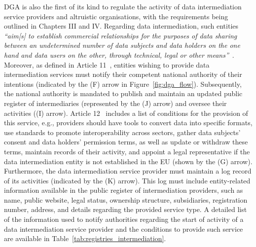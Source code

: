 DGA is also the first of its kind to regulate the activity of data intermediation service providers and altruistic organisations, with the requirements being outlined in Chapters III and IV.
Regarding data intermediation, such entities \textit{``aim[s] to establish commercial relationships for the purposes of data sharing between an undetermined number of data subjects and data holders on the one hand and data users on the other, through technical, legal or other means''}~\citeyearpar{noauthor_regulation_2022}.
Moreover, as defined in Article 11~\citeyearpar{noauthor_regulation_2022}, entities wishing to provide data intermediation services must notify their competent national authority of their intentions (indicated by the (F) arrow in Figure~\ref{fig:dga_flow}).
Subsequently, the national authority is mandated to publish and maintain an updated public register of intermediaries (represented by the (J) arrow) and oversee their activities ((I) arrow).
Article 12~\citeyearpar{noauthor_regulation_2022} includes a list of conditions for the provision of this service, e.g., providers should have tools to convert data into specific formats, use standards to promote interoperability across sectors, gather data subjects' consent and data holders' permission terms, as well as update or withdraw these terms, maintain records of their activity, and appoint a legal representative if the data intermediation entity is not established in the EU (shown by the (G) arrow).
Furthermore, the data intermediation service provider must maintain a log record of its activities (indicated by the (K) arrow).
This log must include entity-related information available in the public register of intermediation providers, such as name, public website, legal status, ownership structure, subsidiaries, registration number, address, and details regarding the provided service type.
A detailed list of the information used to notify authorities regarding the start of activity of a data intermediation service provider and the conditions to provide such service are available in Table~\ref{tab:registries_intermediation}.

